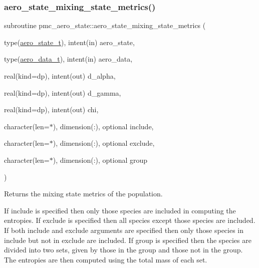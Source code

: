 \mbox{\label{namespacepmc__aero__state_a370d03980bec87029d569a9b9116740d}} 
\subsubsection{\texorpdfstring{aero\+\_\+state\+\_\+mixing\+\_\+state\+\_\+metrics()}{aero\_state\_mixing\_state\_metrics()}}
{\footnotesize\ttfamily subroutine pmc\+\_\+aero\+\_\+state\+::aero\+\_\+state\+\_\+mixing\+\_\+state\+\_\+metrics (\begin{DoxyParamCaption}\item[{type(\mbox{\hyperlink{structpmc__aero__state_1_1aero__state__t}{aero\+\_\+state\+\_\+t}}), intent(in)}]{aero\+\_\+state,  }\item[{type(\mbox{\hyperlink{structpmc__aero__data_1_1aero__data__t}{aero\+\_\+data\+\_\+t}}), intent(in)}]{aero\+\_\+data,  }\item[{real(kind=dp), intent(out)}]{d\+\_\+alpha,  }\item[{real(kind=dp), intent(out)}]{d\+\_\+gamma,  }\item[{real(kind=dp), intent(out)}]{chi,  }\item[{character(len=$\ast$), dimension(\+:), optional}]{include,  }\item[{character(len=$\ast$), dimension(\+:), optional}]{exclude,  }\item[{character(len=$\ast$), dimension(\+:), optional}]{group }\end{DoxyParamCaption})}



Returns the mixing state metrics of the population. 

If {\ttfamily include} is specified then only those species are included in computing the entropies. If {\ttfamily exclude} is specified then all species except those species are included. If both {\ttfamily include} and {\ttfamily exclude} arguments are specified then only those species in {\ttfamily include} but not in {\ttfamily exclude} are included. If {\ttfamily group} is specified then the species are divided into two sets, given by those in the group and those not in the group. The entropies are then computed using the total mass of each set.



